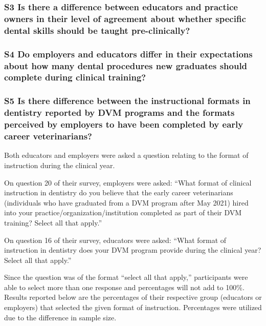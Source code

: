 \documentclass[
  11pt,
  letterpaper,
  DIV=11,
  numbers=noendperiod]{scrartcl}
\numberwithin{figure}{section}
\begin{document}
\subsubsection{S3 Is there a difference between educators and practice
owners in their level of agreement about whether specific dental skills
should be taught
pre-clinically?}\label{s3-is-there-a-difference-between-educators-and-practice-owners-in-their-level-of-agreement-about-whether-specific-dental-skills-should-be-taught-pre-clinically}

\subsubsection{S4 Do employers and educators differ in their
expectations about how many dental procedures new graduates should
complete during clinical
training?}\label{s4-do-employers-and-educators-differ-in-their-expectations-about-how-many-dental-procedures-new-graduates-should-complete-during-clinical-training}

\subsubsection{S5 Is there difference between the instructional formats
in dentistry reported by DVM programs and the formats perceived by
employers to have been completed by early career
veterinarians?}\label{s5-is-there-difference-between-the-instructional-formats-in-dentistry-reported-by-dvm-programs-and-the-formats-perceived-by-employers-to-have-been-completed-by-early-career-veterinarians}

Both educators and employers were asked a question relating to the
format of instruction during the clinical year.

On question 20 of their survey, employers were asked: ``What format of
clinical instruction in dentistry do you believe that the early career
veterinarians (individuals who have graduated from a DVM program after
May 2021) hired into your practice/organization/institution completed as
part of their DVM training? Select all that apply.''

On question 16 of their survey, educators were asked: ``What format of
instruction in dentistry does your DVM program provide during the
clinical year? Select all that apply.''

Since the question was of the format ``select all that apply,''
participants were able to select more than one response and percentages
will not add to 100\%. Results reported below are the percentages of
their respective group (educators or employers) that selected the given
format of instruction. Percentages were utilized due to the difference
in sample size.
\end{document}
